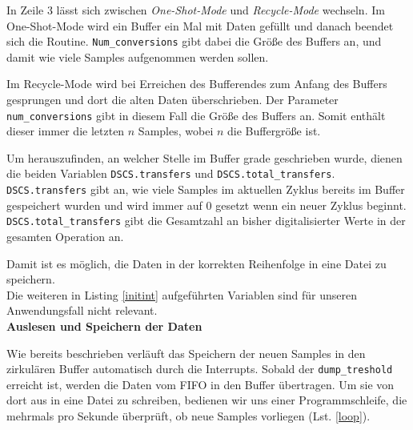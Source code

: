 \documentclass[12pt,a4paper]{scrartcl}
\begin{document}
In Zeile 3 lässt sich zwischen \textit{One-Shot-Mode} und \textit{Recycle-Mode} wechseln. Im One-Shot-Mode wird ein Buffer ein Mal mit Daten gefüllt und danach beendet sich die Routine. \texttt{Num\_conversions} gibt dabei die Größe des Buffers an, und damit wie viele Samples aufgenommen werden sollen.

Im Recycle-Mode wird bei Erreichen des Bufferendes zum Anfang des Buffers gesprungen und dort die alten Daten überschrieben. Der Parameter \texttt{num\_conversions} gibt in diesem Fall die Größe des Buffers an. Somit enthält dieser immer die letzten $n$ Samples, wobei $n$ die Buffergröße ist.

Um herauszufinden, an welcher Stelle im Buffer grade geschrieben wurde, dienen die beiden Variablen \texttt{DSCS.transfers} und \texttt{DSCS.total\_transfers}. \texttt{DSCS.transfers} gibt an, wie viele Samples im aktuellen Zyklus bereits im Buffer gespeichert wurden und wird immer auf 0 gesetzt wenn ein neuer Zyklus beginnt. \texttt{DSCS.total\_transfers} gibt die Gesamtzahl an bisher digitalisierter Werte in der gesamten Operation an.

Damit ist es möglich, die Daten in der korrekten Reihenfolge in eine Datei zu speichern.\\

Die weiteren in Listing \ref{initint} aufgeführten Variablen sind für unseren Anwendungsfall nicht relevant.\\


\textbf{Auslesen und Speichern der Daten}


Wie bereits beschrieben verläuft das Speichern der neuen Samples in den zirkulären Buffer automatisch durch die Interrupts. Sobald der \texttt{dump\_treshold} erreicht ist, werden die Daten vom FIFO in den Buffer übertragen. Um sie von dort aus in eine Datei zu schreiben, bedienen wir uns einer Programmschleife, die mehrmals pro Sekunde überprüft, ob neue Samples vorliegen (Lst. \ref{loop}). 
\end{document}
